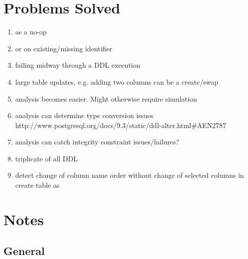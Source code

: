 \documentclass[12pt]{article}
\begin{document}
\newpage

\section{Problems Solved}

\begin{enumerate}
  \item {} as a no-op
  \item {} or  on existing/missing identifier
  \item failing midway through a DDL execution
  \item large table updates, e.g. adding two columns can be a create/swap
  \item analysis becomes easier. Might otherwise require simulation
  \item analysis can determine type conversion issues http://www.postgresql.org/docs/9.3/static/ddl-alter.html#AEN2787
  \item analysis can catch integrity constraint issues/failures?
  \item triplicate of all DDL
  \item detect change of column name order without change of selected columns in create table as
\end{enumerate}

\section{Notes}

\subsection{General}
\end{document}

